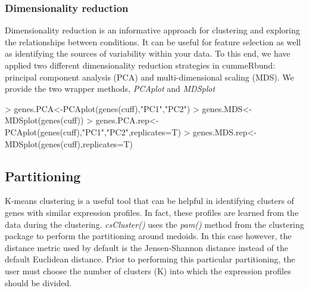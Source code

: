 \documentclass[10pt]{article}
\newcommand{\Rpackage}[1]{\textsf{#1}}
\newcommand{\Rmethod}[1]{{\textit{#1}}}
\begin{document}
\subsubsection{Dimensionality reduction}
Dimensionality reduction is an informative approach for clustering and exploring
the relationships between conditions.  It can be useful for feature selection as
well as identifying the sources of variability within your data.  To this end,
we have applied two different dimensionality reduction strategies in
\Rpackage{cummeRbund}: principal component analysis (PCA) and multi-dimensional
scaling (MDS). We provide the two wrapper methods, \Rmethod{PCAplot} and
\Rmethod{MDSplot}

\begin{Schunk}
\begin{Sinput}
> genes.PCA<-PCAplot(genes(cuff),"PC1","PC2")
> genes.MDS<-MDSplot(genes(cuff))
> genes.PCA.rep<-PCAplot(genes(cuff),"PC1","PC2",replicates=T)
> genes.MDS.rep<-MDSplot(genes(cuff),replicates=T)
\end{Sinput}
\end{Schunk}

\begin{figure}[htp]
	\begin{center}
	\qquad
	\qquad
	\qquad
	\end{center}
\end{figure}

\clearpage

\subsection{Partitioning}
K-means clustering is a useful tool that can be helpful in identifying clusters of genes with similar expression profiles. In fact, these profiles are learned from the data during the clustering. 
\Rmethod{csCluster()} uses the \Rmethod{pam()} method from the \Rpackage{clustering} package to perform the partitioning around medoids. In this case however, the distance metric used by default is the
Jensen-Shannon distance instead of the default Euclidean distance. Prior to performing this particular partitioning, the user must choose the number of clusters (K) into which the expression profiles should be divided. 
\end{document}
